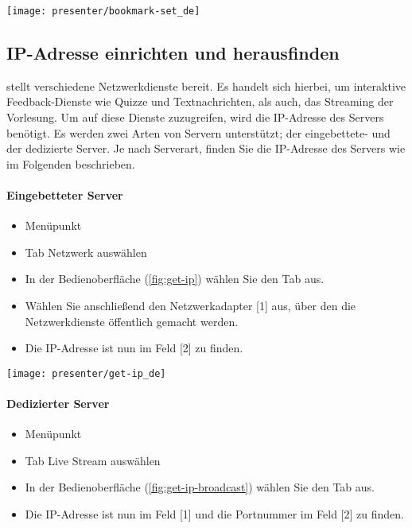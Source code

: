\begin{minipage}{0.9\textwidth}
	\centering
	\captionsetup{type=figure}
	\texttt{[image: presenter/bookmark-set\_de]}
  	\label{fig:bookmark-set}
\end{minipage}


\subsection{IP-Adresse einrichten und herausfinden}
\label{section:get-ip}
\lectPresenter{} stellt verschiedene Netzwerkdienste bereit. Es handelt sich hierbei, um interaktive Feedback-Dienste wie Quizze und Textnachrichten, als auch, das Streaming der Vorlesung. Um auf diese Dienste zuzugreifen, wird die IP-Adresse des Servers benötigt. Es werden zwei Arten von Servern unterstützt; der eingebettete- und der dedizierte Server. Je nach Serverart, finden Sie die IP-Adresse des Servers wie im Folgenden beschrieben.

\paragraph{Eingebetteter Server}
\begin{itemize}
	\item Menüpunkt 
	\item Tab Netzwerk auswählen
	\item In der Bedienoberfläche (\autoref{fig:get-ip}) wählen Sie den Tab  aus.
	\item Wählen Sie anschließend den Netzwerkadapter [1] aus, über den die Netzwerkdienste öffentlich gemacht werden.
	\item Die IP-Adresse ist nun im Feld  [2] zu finden.
\end{itemize}

\par
\begin{minipage}{0.9\textwidth}
	\centering
	\captionsetup{type=figure}
	\texttt{[image: presenter/get-ip\_de]}
  	\label{fig:get-ip}
\end{minipage}

\paragraph{Dedizierter Server}
\begin{itemize}
	\item Menüpunkt 
	\item Tab Live Stream auswählen
	\item In der Bedienoberfläche (\autoref{fig:get-ip-broadcast}) wählen Sie den Tab  aus.
	\item Die IP-Adresse ist nun im Feld  [1] und die Portnummer im Feld  [2] zu finden.
\end{itemize}

